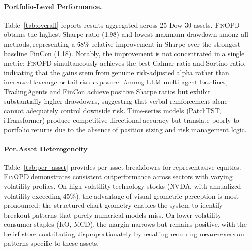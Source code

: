 \paragraph{Portfolio-Level Performance.} Table~\ref{tab:overall} reports results aggregated across 25 Dow-30 assets. \textsc{FinOPD} obtains the highest Sharpe ratio (1.98) and lowest maximum drawdown among all methods, representing a 68\% relative improvement in Sharpe over the strongest baseline FinCon (1.18). Notably, the improvement is not concentrated in a single metric: \textsc{FinOPD} simultaneously achieves the best Calmar ratio and Sortino ratio, indicating that the gains stem from genuine risk-adjusted alpha rather than increased leverage or tail-risk exposure. Among LLM multi-agent baselines, TradingAgents and FinCon achieve positive Sharpe ratios but exhibit substantially higher drawdowns, suggesting that verbal reinforcement alone cannot adequately control downside risk. Time-series models (PatchTST, iTransformer) produce competitive directional accuracy but translate poorly to portfolio returns due to the absence of position sizing and risk management logic.



\paragraph{Per-Asset Heterogeneity.} Table~\ref{tab:per_asset} provides per-asset breakdowns for representative equities. \textsc{FinOPD} demonstrates consistent outperformance across sectors with varying volatility profiles. On high-volatility technology stocks (NVDA, with annualized volatility exceeding 45\%), the advantage of visual-geometric perception is most pronounced: the structured chart geometry enables the system to identify breakout patterns that purely numerical models miss. On lower-volatility consumer staples (KO, MCD), the margin narrows but remains positive, with the belief store contributing disproportionately by recalling recurring mean-reversion patterns specific to these assets.

